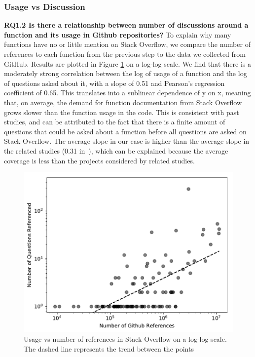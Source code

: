 \subsubsection{Usage vs Discussion}
\textbf{RQ1.2 Is there a relationship between number of discussions around a function and its usage in Github repositories?}
To explain why many functions have no or little mention on Stack Overflow, we compare the number of references to each function from the previous step to the data we collected from GitHub. Results are plotted in Figure \ref{fig:usageref} on a log-log scale. We find that there is a moderately strong correlation between the log of usage of a function and the log of questions asked about it, with a slope of 0.51 and Pearson's regression coefficient of 0.65. This translates into a sublinear dependence of y on x, meaning that, on average, the demand for function documentation from Stack Overflow grows slower than the function usage in the code. This is consistent with past studies, and can be attributed to the fact that there is a finite amount of questions that could be asked about a function before all questions are asked on Stack Overflow. The average slope in our case is higher than the average slope in the related studies (0.31 in~\cite{Kavaler2013}), which can be explained because the average coverage is less than the projects considered by related studies.

\begin{figure}[t!]
  \centering
  \includegraphics[width=\columnwidth]{scripts/figures/1-2-usage-vs-coverage.pdf}
  \caption{Usage vs number of references in Stack Overflow on a log-log scale. The dashed line represents the trend between the points}
  \label{fig:usageref}
\end{figure}

